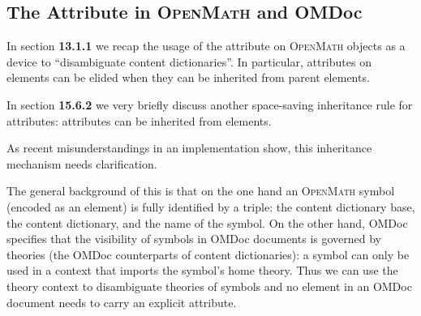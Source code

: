 \documentclass{article}
\def\omdoc{OMDoc}
\def\openmath{\scshape{OpenMath}}
\begin{document}
\subsection{The {} Attribute in {\openmath} and {\omdoc}}

In section {\textbf{13.1.1}} we recap the usage of the {} attribute
on {\openmath} objects as a device to ``disambiguate content dictionaries''. In
particular, {} attributes on {}
elements can be elided when they can be inherited from parent elements.

In section {\textbf{15.6.2}} we very briefly discuss another space-saving inheritance rule
for {} attributes: {}
attributes can be inherited from {} elements. 

As recent misunderstandings in an implementation show, this inheritance mechanism needs
clarification. 

The general background of this is that on the one hand an {\openmath} symbol (encoded as
an {} element) is fully identified by a triple: the content
dictionary base, the content dictionary, and the name of the symbol. On the other hand,
{\omdoc} specifies that the visibility of symbols in {\omdoc} documents is governed by
theories (the {\omdoc} counterparts of content dictionaries): a symbol can only be used in
a context that imports the symbol's home theory. Thus we can use the theory context to
disambiguate theories of symbols and no {} element in an {\omdoc}
document needs to carry an explicit {} attribute.
\end{document}
